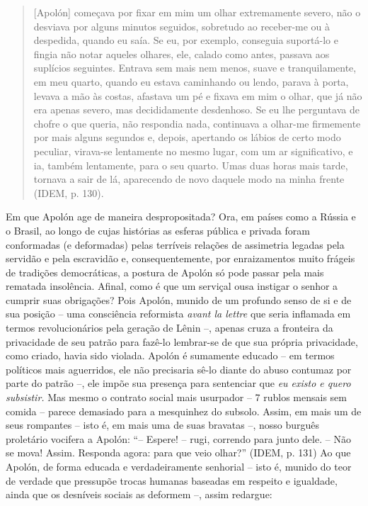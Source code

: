 \begin{quote}
{[}Apolón{]} começava por fixar em mim um olhar extremamente severo, não
o desviava por alguns minutos seguidos, sobretudo ao receber-me ou à
despedida, quando eu saía. Se eu, por exemplo, conseguia suportá-lo e
fingia não notar aqueles olhares, ele, calado como antes, passava aos
suplícios seguintes. Entrava sem mais nem menos, suave e tranquilamente,
em meu quarto, quando eu estava caminhando ou lendo, parava à porta,
levava a mão às costas, afastava um pé e fixava em mim o olhar, que já
não era apenas severo, mas decididamente desdenhoso. Se eu lhe
perguntava de chofre o que queria, não respondia nada, continuava a
olhar-me firmemente por mais alguns segundos e, depois, apertando os
lábios de certo modo peculiar, virava-se lentamente no mesmo lugar, com
um ar significativo, e ia, também lentamente, para o seu quarto. Umas
duas horas mais tarde, tornava a sair de lá, aparecendo de novo daquele
modo na minha frente (IDEM, p. 130).
\end{quote}

Em que Apolón age de maneira despropositada? Ora, em países como a
Rússia e o Brasil, ao longo de cujas histórias as esferas pública e
privada foram conformadas (e deformadas) pelas terríveis relações de
assimetria legadas pela servidão e pela escravidão e, consequentemente,
por enraizamentos muito frágeis de tradições democráticas, a postura de
Apolón só pode passar pela mais rematada insolência. Afinal, como é que
um serviçal ousa instigar o senhor a cumprir suas obrigações? Pois
Apolón, munido de um profundo senso de si e de sua posição -- uma
consciência reformista \emph{avant la lettre} que seria inflamada em
termos revolucionários pela geração de Lênin --, apenas cruza a
fronteira da privacidade de seu patrão para fazê-lo lembrar-se de que
sua própria privacidade, como criado, havia sido violada. Apolón é
sumamente educado -- em termos políticos mais aguerridos, ele não
precisaria sê-lo diante do abuso contumaz por parte do patrão --, ele
impõe sua presença para sentenciar que \emph{eu existo e quero
subsistir.} Mas mesmo o contrato social mais usurpador -- 7 rublos
mensais sem comida -- parece demasiado para a mesquinhez do subsolo.
Assim, em mais um de seus rompantes -- isto é, em mais uma de suas
bravatas --, nosso burguês proletário vocifera a Apolón: ``-- Espere! --
rugi, correndo para junto dele. -- Não se mova! Assim. Responda agora:
para que veio olhar?'' (IDEM, p. 131) Ao que Apolón, de forma educada e
verdadeiramente senhorial -- isto é, munido do teor de verdade que
pressupõe trocas humanas baseadas em respeito e igualdade, ainda que os
desníveis sociais as deformem --, assim redargue:

